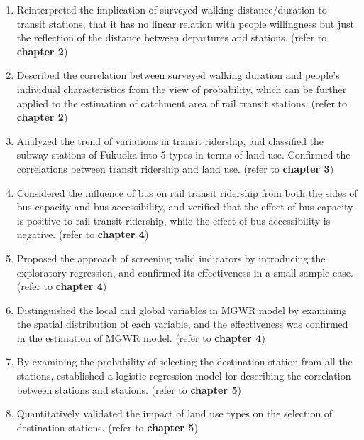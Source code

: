 \begin{enumerate}
	\item Reinterpreted the implication of surveyed walking distance/duration to transit stations, that it has no linear relation with people willingness but just the reflection of the distance between departures and stations. (refer to \textbf{chapter 2})
	
	\item Described the correlation between surveyed walking duration and people's individual characteristics from the view of probability, which can be further applied to the estimation of catchment area of rail transit stations. (refer to \textbf{chapter 2})
	
	\item Analyzed the trend of variations in transit ridership, and classified the subway stations of Fukuoka into 5 types in terms of land use. Confirmed the correlations between transit ridership and land use. (refer to \textbf{chapter 3})
	
	\item Considered the influence of bus on rail transit ridership from both the sides of bus capacity and bus accessibility, and verified that the effect of bus capacity is positive to rail transit ridership, while the effect of bus accessibility is negative. (refer to \textbf{chapter 4})
	
	\item Proposed the approach of screening valid indicators by introducing the exploratory regression, and confirmed its effectiveness in a small sample case. (refer to \textbf{chapter 4})
	
	\item Distinguished the local and global variables in MGWR model by examining the spatial distribution of each variable, and the effectiveness was confirmed in the estimation of MGWR model. (refer to \textbf{chapter 4})
	
	\item By examining the probability of selecting the destination station from all the stations, established a logistic regression model for describing the correlation between stations and stations. (refer to \textbf{chapter 5})
	
	\item Quantitatively validated the impact of land use types on the selection of destination stations. (refer to \textbf{chapter 5})
	
\end{enumerate} 

